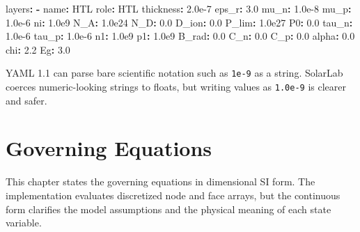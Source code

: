 \documentclass[
  11pt,
  american,
]{report}
\newenvironment{Shaded}{}{}
\newcommand{\AttributeTok}[1]{\textcolor[rgb]{0.49,0.56,0.16}{#1}}
\newcommand{\FloatTok}[1]{\textcolor[rgb]{0.25,0.63,0.44}{#1}}
\newcommand{\FunctionTok}[1]{\textcolor[rgb]{0.02,0.16,0.49}{#1}}
\newcommand{\KeywordTok}[1]{\textcolor[rgb]{0.00,0.44,0.13}{\textbf{#1}}}
\begin{document}
\begin{Shaded}
\begin{Highlighting}[]
\FunctionTok{layers}\KeywordTok{:}
\AttributeTok{  }\KeywordTok{{-}}\AttributeTok{ }\FunctionTok{name}\KeywordTok{:}\AttributeTok{ HTL}
\AttributeTok{    }\FunctionTok{role}\KeywordTok{:}\AttributeTok{ HTL}
\AttributeTok{    }\FunctionTok{thickness}\KeywordTok{:}\AttributeTok{ }\FloatTok{2.0e{-}7}
\AttributeTok{    }\FunctionTok{eps\_r}\KeywordTok{:}\AttributeTok{ }\FloatTok{3.0}
\AttributeTok{    }\FunctionTok{mu\_n}\KeywordTok{:}\AttributeTok{ }\FloatTok{1.0e{-}8}
\AttributeTok{    }\FunctionTok{mu\_p}\KeywordTok{:}\AttributeTok{ }\FloatTok{1.0e{-}6}
\AttributeTok{    }\FunctionTok{ni}\KeywordTok{:}\AttributeTok{ }\FloatTok{1.0e9}
\AttributeTok{    }\FunctionTok{N\_A}\KeywordTok{:}\AttributeTok{ }\FloatTok{1.0e24}
\AttributeTok{    }\FunctionTok{N\_D}\KeywordTok{:}\AttributeTok{ }\FloatTok{0.0}
\AttributeTok{    }\FunctionTok{D\_ion}\KeywordTok{:}\AttributeTok{ }\FloatTok{0.0}
\AttributeTok{    }\FunctionTok{P\_lim}\KeywordTok{:}\AttributeTok{ }\FloatTok{1.0e27}
\AttributeTok{    }\FunctionTok{P0}\KeywordTok{:}\AttributeTok{ }\FloatTok{0.0}
\AttributeTok{    }\FunctionTok{tau\_n}\KeywordTok{:}\AttributeTok{ }\FloatTok{1.0e{-}6}
\AttributeTok{    }\FunctionTok{tau\_p}\KeywordTok{:}\AttributeTok{ }\FloatTok{1.0e{-}6}
\AttributeTok{    }\FunctionTok{n1}\KeywordTok{:}\AttributeTok{ }\FloatTok{1.0e9}
\AttributeTok{    }\FunctionTok{p1}\KeywordTok{:}\AttributeTok{ }\FloatTok{1.0e9}
\AttributeTok{    }\FunctionTok{B\_rad}\KeywordTok{:}\AttributeTok{ }\FloatTok{0.0}
\AttributeTok{    }\FunctionTok{C\_n}\KeywordTok{:}\AttributeTok{ }\FloatTok{0.0}
\AttributeTok{    }\FunctionTok{C\_p}\KeywordTok{:}\AttributeTok{ }\FloatTok{0.0}
\AttributeTok{    }\FunctionTok{alpha}\KeywordTok{:}\AttributeTok{ }\FloatTok{0.0}
\AttributeTok{    }\FunctionTok{chi}\KeywordTok{:}\AttributeTok{ }\FloatTok{2.2}
\AttributeTok{    }\FunctionTok{Eg}\KeywordTok{:}\AttributeTok{ }\FloatTok{3.0}
\end{Highlighting}
\end{Shaded}

YAML 1.1 can parse bare scientific notation such as \texttt{1e-9} as a
string. SolarLab coerces numeric-looking strings to floats, but writing
values as \texttt{1.0e-9} is clearer and safer.

\hypertarget{governing-equations}{%
\chapter{Governing Equations}\label{governing-equations}}

This chapter states the governing equations in dimensional SI form. The
implementation evaluates discretized node and face arrays, but the
continuous form clarifies the model assumptions and the physical meaning
of each state variable.
\end{document}
